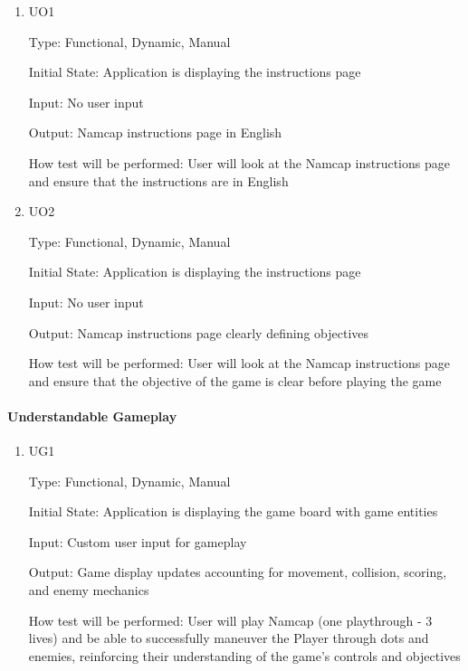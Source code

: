 \documentclass[12pt, titlepage]{article}
\begin{document}
\begin{enumerate}

\item{UO1\\}

Type: Functional, Dynamic, Manual
					
Initial State: Application is displaying the instructions page
					
Input: No user input
					
Output: Namcap instructions page in English
					
How test will be performed: User will look at the Namcap instructions page and ensure that the instructions are in English
					
\item{UO2\\}

Type: Functional, Dynamic, Manual
					
Initial State: Application is displaying the instructions page
					
Input: No user input
					
Output: Namcap instructions page clearly defining objectives
					
How test will be performed: User will look at the Namcap instructions page and ensure that the objective of the game is clear before playing the game

\end{enumerate}

\paragraph{Understandable Gameplay}

\begin{enumerate}

\item{UG1\\}

Type: Functional, Dynamic, Manual
					
Initial State: Application is displaying the game board with game entities
					
Input: Custom user input for gameplay
					
Output: Game display updates accounting for movement, collision, scoring, and enemy mechanics
					
How test will be performed: User will play Namcap (one playthrough - 3 lives) and be able to successfully maneuver the Player through dots and enemies, reinforcing their understanding of the game's controls and objectives

\end{enumerate}
\end{document}
